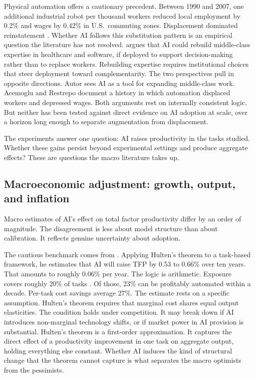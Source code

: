 \documentclass[12pt]{article}
\begin{document}
Physical automation offers a cautionary precedent. Between 1990 and 2007, one additional industrial robot per thousand workers reduced local employment by 0.2\% and wages by 0.42\% in U.S.\ commuting zones. Displacement dominated reinstatement \citep{acemoglu2020robots}. Whether AI follows this substitution pattern is an empirical question the literature has not resolved. \citet{autor2024} argues that AI could rebuild middle-class expertise in healthcare and software, if deployed to support decision-making rather than to replace workers. Rebuilding expertise requires institutional choices that steer deployment toward complementarity. The two perspectives pull in opposite directions. Autor sees AI as a tool for expanding middle-class work. Acemoglu and Restrepo document a history in which automation displaced workers and depressed wages. Both arguments rest on internally consistent logic. But neither has been tested against direct evidence on AI adoption at scale, over a horizon long enough to separate augmentation from displacement.

The experiments answer one question: AI raises productivity in the tasks studied. Whether these gains persist beyond experimental settings and produce aggregate effects? These are questions the macro literature takes up.


\subsection{Macroeconomic adjustment: growth, output, and inflation}

Macro estimates of AI's effect on total factor productivity differ by an order of magnitude. The disagreement is less about model structure than about calibration. It reflects genuine uncertainty about adoption.

The cautious benchmark comes from \citet{acemoglu2024simple}. Applying Hulten's theorem to a task-based framework, he estimates that AI will raise TFP by 0.53 to 0.66\% over ten years. That amounts to roughly 0.06\% per year. The logic is arithmetic. Exposure covers roughly 20\% of tasks \citep{eloundou2024}. Of those, 23\% can be profitably automated within a decade. Per-task cost savings average 27\%. The estimate rests on a specific assumption. Hulten's theorem requires that marginal cost shares equal output elasticities. The condition holds under competition. It may break down if AI introduces non-marginal technology shifts, or if market power in AI provision is substantial. Hulten's theorem is a first-order approximation. It captures the direct effect of a productivity improvement in one task on aggregate output, holding everything else constant. Whether AI induces the kind of structural change that the theorem cannot capture is what separates the macro optimists from the pessimists.
\end{document}
